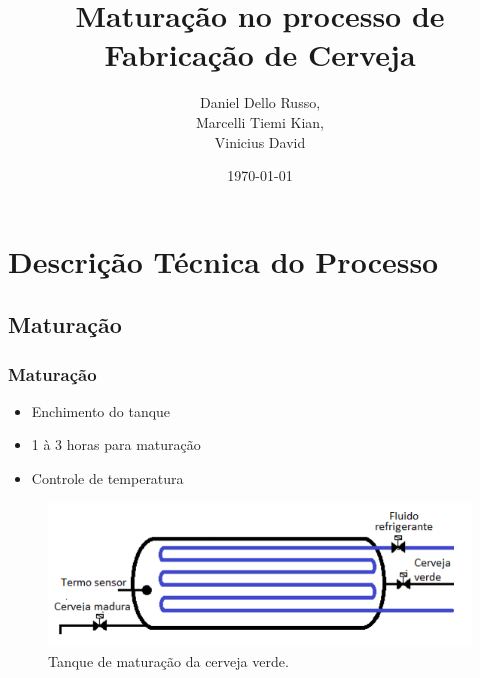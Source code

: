 \documentclass{beamer}
\title[Projeto Final]{Maturação no processo de Fabricação de Cerveja} %
\author{Daniel Dello Russo,\\ Marcelli Tiemi Kian,\\ Vinicius David} %
\institute[FEM] %
{
Universidade Estadual de Campinas \\ %
\medskip
\textit{} %
}
\date{\today} %
\begin{document}
\begin{frame}
\titlepage %
\end{frame}

\begin{frame}

\tableofcontents %
\end{frame}


\section{Descrição Técnica do Processo} 
\subsection{Maturação}
\begin{frame}
\frametitle{Maturação}
\begin{itemize}
	\item Enchimento do tanque
	\item 1 à 3 horas para maturação
	\item Controle de temperatura
\end{itemize}


	\begin{figure}[H]
		\centering
		\includegraphics [width=0.5\linewidth]{tanque.png}
		\caption {Tanque de maturação da cerveja verde.}
		\label{fig:maturador}
	\end{figure}
\end{frame}
\end{document}
